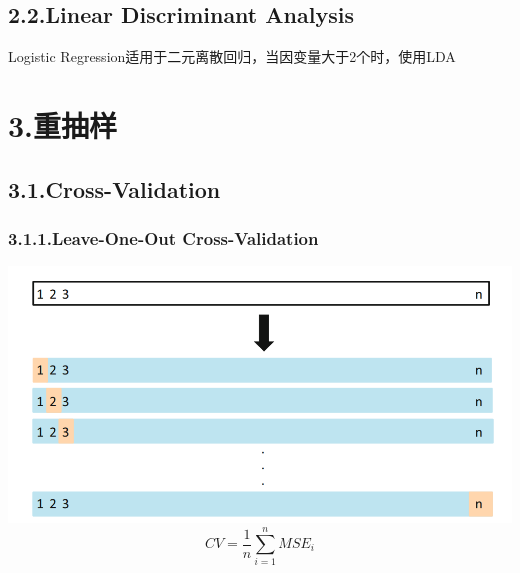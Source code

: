 \documentclass{article}
\begin{document}
{%
\subsection{2.2.\hspace*{0.5em}Linear Discriminant Analysis}\label{sec-linear-discriminant-analysis}%

\noindent{}Logistic Regression适用于二元离散回归，当因变量大于2个时，使用LDA%

\section{3.\hspace*{0.5em}重抽样}\label{section}%

\subsection{3.1.\hspace*{0.5em}Cross-Validation}\label{sec-cross-validation}%

\subsubsection{3.1.1.\hspace*{0.5em}Leave-One-Out Cross-Validation}\label{sec-leave-one-out-cross-validation}%

\noindent{}\includegraphics[keepaspectratio=true,width=\dimmin{}{\dimwidth{0.80}}]{images/LOOCV}{}%
\label{}%
\noindent{}
\noindent\[%
  CV=\frac{1}{n}\sum_{i=1}^{n}MSE_i
\]%

}
\end{document}
